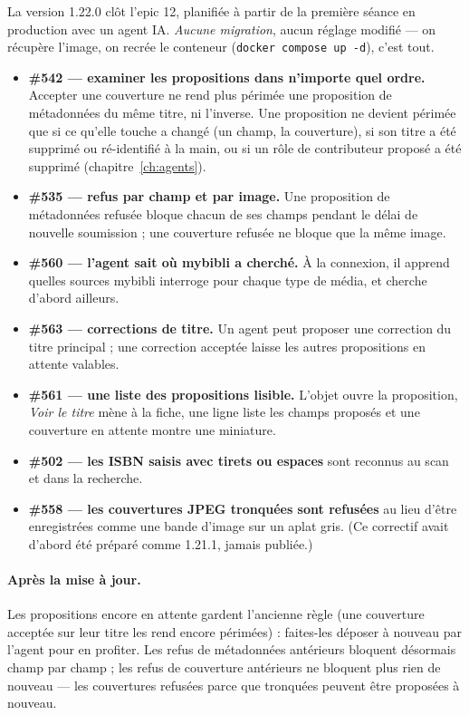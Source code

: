 La version 1.22.0 clôt l'epic 12, planifiée à partir de la première
séance en production avec un agent IA. \emph{Aucune migration}, aucun
réglage modifié --- on récupère l'image, on recrée le conteneur
(\texttt{docker compose up -d}), c'est tout.

\begin{itemize}
  \item \textbf{\#542 \string— examiner les propositions dans
        n'importe quel ordre.} Accepter une couverture ne rend plus
        périmée une proposition de métadonnées du même titre, ni
        l'inverse. Une proposition ne devient périmée que si ce
        qu'elle touche a changé (un champ, la couverture), si son
        titre a été supprimé ou ré-identifié à la main, ou si un rôle
        de contributeur proposé a été supprimé
        (chapitre~\ref{ch:agents}).
  \item \textbf{\#535 \string— refus par champ et par image.} Une
        proposition de métadonnées refusée bloque chacun de ses champs
        pendant le délai de nouvelle soumission ; une couverture
        refusée ne bloque que la même image.
  \item \textbf{\#560 \string— l'agent sait où mybibli a cherché.} À
        la connexion, il apprend quelles sources mybibli interroge pour
        chaque type de média, et cherche d'abord ailleurs.
  \item \textbf{\#563 \string— corrections de titre.} Un agent peut
        proposer une correction du titre principal ; une correction
        acceptée laisse les autres propositions en attente valables.
  \item \textbf{\#561 \string— une liste des propositions lisible.}
        L'objet ouvre la proposition, \emph{Voir le titre} mène à la
        fiche, une ligne liste les champs proposés et une couverture en
        attente montre une miniature.
  \item \textbf{\#502 \string— les ISBN saisis avec tirets ou espaces}
        sont reconnus au scan et dans la recherche.
  \item \textbf{\#558 \string— les couvertures JPEG tronquées sont
        refusées} au lieu d'être enregistrées comme une bande d'image
        sur un aplat gris. (Ce correctif avait d'abord été préparé comme
        1.21.1, jamais publiée.)
\end{itemize}

\paragraph{Après la mise à jour.} Les propositions encore en attente
gardent l'ancienne règle (une couverture acceptée sur leur titre les
rend encore périmées) : faites-les déposer à nouveau par l'agent pour
en profiter. Les refus de métadonnées antérieurs bloquent désormais
champ par champ ; les refus de couverture antérieurs ne bloquent plus
rien de nouveau --- les couvertures refusées parce que tronquées
peuvent être proposées à nouveau.

